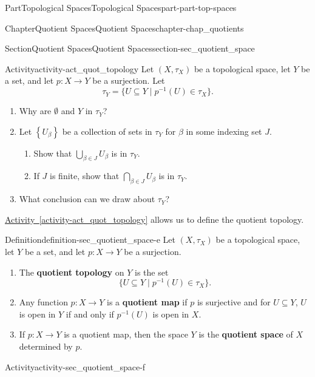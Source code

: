 \documentclass[oneside,10pt,]{book}
\newcommand{\xreffont}{\relax}
\newcommand{\terminology}[1]{\textbf{#1}}
\numberwithin{equation}{chapter}
\begin{document}
\begin{partptx}{Part}{Topological Spaces}{}{Topological Spaces}{}{}{part-part-top-spaces}
\begin{chapterptx}{Chapter}{Quotient Spaces}{}{Quotient Spaces}{}{}{chapter-chap_quotients}
\begin{sectionptx}{Section}{Quotient Spaces}{}{Quotient Spaces}{}{}{section-sec_quotient_space}
\begin{activity}{Activity}{}{activity-act_quot_topology}
Let \((X,\tau_X)\) be a topological space, let \(Y\) be a set, and let \(p: X \to Y\) be a surjection. Let%
\begin{equation*}
\tau_Y = \{U \subseteq Y \mid p^{-1}(U) \in \tau_X\}\text{.}
\end{equation*}
%
\begin{enumerate}[font=\bfseries,label=(\alph*),ref=\alph*]%
\item{}Why are \(\emptyset\) and \(Y\) in \(\tau_Y\)?%
\item{}Let \(\left\{U_{\beta}\right\}\) be a collection of sets in \(\tau_Y\) for \(\beta\) in some indexing set \(J\).%
\begin{enumerate}[font=\bfseries,label=(\roman*),ref=\theenumi.\roman*]%
\item{}Show that \(\bigcup_{\beta \in J} U_{\beta}\) is in \(\tau_Y\).%
\item{}If \(J\) is finite, show that \(\bigcap_{\beta \in J} U_{\beta}\) is in \(\tau_Y\).%
\end{enumerate}%
\item{}What conclusion can we draw about \(\tau_Y\)?%
\end{enumerate}%
\end{activity}%
\hyperref[activity-act_quot_topology]{Activity~{\xreffont\ref{activity-act_quot_topology}}} allows us to define the quotient topology.%
\begin{definition}{Definition}{}{definition-sec_quotient_space-e}%
%
%
%
Let \((X,\tau_X)\) be a topological space, let \(Y\) be a set, and let \(p: X \to Y\) be a surjection.%
\begin{enumerate}
\item{}The \terminology{quotient topology} on \(Y\) is the set%
\begin{equation*}
\{U \subseteq Y \mid p^{-1}(U) \in \tau_X\}\text{.}
\end{equation*}
%
\item{}Any function \(p: X \to Y\) is a \terminology{quotient map} if \(p\) is surjective and for \(U \subseteq Y\), \(U\) is open in \(Y\) if and only if \(p^{-1}(U)\) is open in \(X\).%
\item{}If \(p: X \to Y\) is a quotient map, then the space \(Y\) is the \terminology{quotient space} of \(X\) determined by \(p\).%
\end{enumerate}
%
\end{definition}
\begin{activity}{Activity}{}{activity-sec_quotient_space-f}%

\end{activity}
\end{sectionptx}
\end{chapterptx}
\end{partptx}
\end{document}
